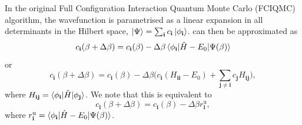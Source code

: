 \documentclass[%
 reprint,
 amsmath,amssymb,
 aps,
]{revtex4-2}
\begin{document}
{ In the original Full Configuration Interaction Quantum Monte Carlo (FCIQMC) algorithm,\cite{Booth2009} the wavefunction is parametrised as a linear expansion in all determinants in the Hilbert space, $\ket{\Psi} = \sum_\mathbf{i}c_\mathbf{i}\ket{\phi_\mathbf{i}}$.  can then be approximated as
\begin{equation}
    c_\mathbf{i}(\beta + \Delta \beta) = c_\mathbf{i}(\beta) - \Delta\beta\braket{\phi_\mathbf{i}|\hat H-E_0|\Psi(\beta)}
\end{equation}
or
\begin{equation}
  c_\mathbf{i}(\beta + \Delta \beta) = c_\mathbf{i}(\beta) - \Delta\beta\Big(c_\mathbf{i} (H_\mathbf{ii} - E_0) + \sum_{\mathbf{j} \neq \mathbf{i}} c_\mathbf{j}H_\mathbf{ij}\Big),  
  \label{eq:pop_dyn}
\end{equation}
where $H_\mathbf{ij} = \braket{\phi_\mathbf{i}|\hat H|\phi_\mathbf{j}}$. We note that this is equivalent to 
\begin{equation}
c_\mathbf{i}(\beta + \Delta \beta) = c_\mathbf{i}(\beta) - \Delta\beta r^\mathrm{u}_\mathbf{i},
\label{eq:param_resid}
\end{equation}
where { 
${r^\mathrm{u}_\mathbf{i} = \braket{\phi_\mathbf{i}|\hat H-E_0|\Psi(\beta)}}$.} 

}
\end{document}
